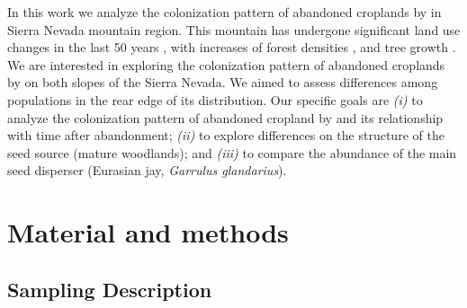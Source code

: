 In this work we analyze the colonization pattern of abandoned croplands by \Qpy in Sierra Nevada mountain region. This mountain has undergone significant land use changes in the last 50 years \autocites{JimenezOlivenciaetal2015EvolucionUsos}, with increases of forest densities \autocite[see chapter \ref{sec:carbon}; also][]{JimenezOlivenciaetal2015MedioSiglo}, and tree growth \autocite[see chapter \ref{sec:dendro};][]{PerezLuqueetal2020LanduseLegacies}. We are interested in exploring the colonization pattern of abandoned croplands by \Qp on both slopes of the Sierra Nevada. We aimed to assess differences among populations in the rear edge of its distribution. Our specific goals are \emph{(i)} to analyze the colonization pattern of abandoned cropland by \Qp and its relationship with time after abandonment; \emph{(ii)} to explore differences on the structure of the seed source (mature woodlands); and \emph{(iii)} to compare the abundance of the main seed disperser (Eurasian jay, \emph{Garrulus glandarius}).

\section{Material and methods}\label{sec:coloniza:MatMet}
\subsection{Sampling Description}\label{sec:coloniza:sampling}

\begin{table}
\caption{Abandonment cropland features}
\centering
{}
\label{tab:coloniza:croplands}
\end{table}

